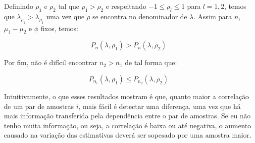 \documentclass[
  11pt,
]{article}
\begin{document}
Definindo \(\rho_1\) e \(\rho_2\) tal que \(\rho_1 > \rho_2\) e respeitando \(-1 \leq \rho_l \leq 1\) para \(l=1,2\), temos que \(\lambda_{\rho_1} > \lambda_{\rho_1}\) uma vez que \(\rho\) se encontra no denominador de \(\lambda\). Assim para \(n\), \(\mu_1 - \mu_2\) e \(\phi\) fixos, temos:

\[
P_n(\lambda, \rho_1) > P_n(\lambda, \rho_2)
\]

Por fim, não é difícil encontrar \(n_2 > n_1\) de tal forma que:

\[
P_{n_1}(\lambda, \rho_1) \leq P_{n_2}(\lambda, \rho_2)
\]

Intuitivamente, o que esses resultados mostram é que, quanto maior a correlação de um par de amostras \(i\), mais fácil é detectar uma diferença, uma vez que há mais informação transferida pela dependência entre o par de amostras. Se eu não tenho muita informação, ou seja, a correlação é baixa ou até negativa, o aumento causado na variação das estimativas deverá ser sopesado por uma amostra maior.
\end{document}
